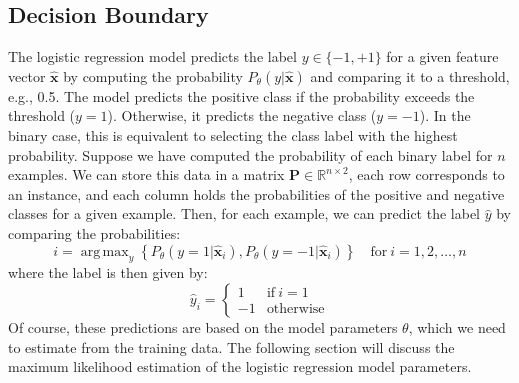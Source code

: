 \documentclass{article}[11pt]
\DeclareMathOperator*{\argmax}{arg\,max}
\begin{document}
\subsection{Decision Boundary}
The logistic regression model predicts the label $y\in\{-1,+1\}$ for a given feature vector $\hat{\mathbf{x}}$ by computing the probability $P_{\theta}(y|\hat{\mathbf{x}})$  and comparing it to a 
threshold, e.g., 0.5. The model predicts the positive class if the probability exceeds the threshold ($y = 1$). Otherwise, it predicts the negative class ($y = -1$).
In the binary case, this is equivalent to selecting the class label with the highest probability.
Suppose we have computed the probability of each binary label for $n$ examples. We can store this data in a matrix $\mathbf{P}\in\mathbb{R}^{n\times 2}$,
each row corresponds to an instance, and each column holds the probabilities of the positive and negative classes for a given example. Then, for each example, we can predict the label $\hat{y}$ by comparing the probabilities:
\begin{equation}
    i = \argmax_{y} \left\{P_{\theta}(y = 1|\hat{\mathbf{x}}_{i}), P_{\theta}(y = -1|\hat{\mathbf{x}}_{i})\right\}\quad\text{for}~i = 1,2,\dots,n
\end{equation}
where the label is then given by:
\begin{equation}
    \hat{y}_{i} = \begin{cases}
    1 & \text{if}~i = 1\\
    -1 & \text{otherwise}
    \end{cases}
\end{equation}
Of course, these predictions are based on the model parameters $\theta$, which we need to estimate from the training data.
The following section will discuss the maximum likelihood estimation of the logistic regression model parameters.
\end{document}
